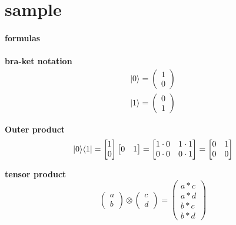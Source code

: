 \documentclass[12p,a4paper,twoside]{article}
\begin{document}

  
  \newpage

  \section*{sample}
  \paragraph{formulas}
\paragraph{}
\textbf{bra-ket notation}
\begin{gather}
    |0\rangle =
    \begin{pmatrix}\label{ket0}
        1 \\
        0
    \end{pmatrix} \\
    |1\rangle =
    \begin{pmatrix}\label{ket1}
        0 \\
        1
    \end{pmatrix}
\end{gather}

\textbf{Outer product}
\begin{equation}
    |0\rangle\langle 1| =
    \begin{bmatrix}
        1 \\
        0
    \end{bmatrix}
    \begin{bmatrix}
        0 & 1
    \end{bmatrix} =
    \begin{bmatrix}
        1 \cdot 0 & 1 \cdot 1 \\
        0 \cdot 0 & 0 \cdot 1
    \end{bmatrix} =
    \begin{bmatrix}
        0 & 1 \\
        0 & 0
    \end{bmatrix}
    \notag
\end{equation}

\textbf{tensor product}
\begin{equation}
    \begin{pmatrix}
        a \\
        b
    \end{pmatrix}
    \otimes
    \begin{pmatrix}
        c \\
        d
    \end{pmatrix} =
    \begin{pmatrix}
        a \ast c \\
        a \ast d \\
        b \ast c \\
        b \ast d
    \end{pmatrix}
\end{equation}
\end{document}

